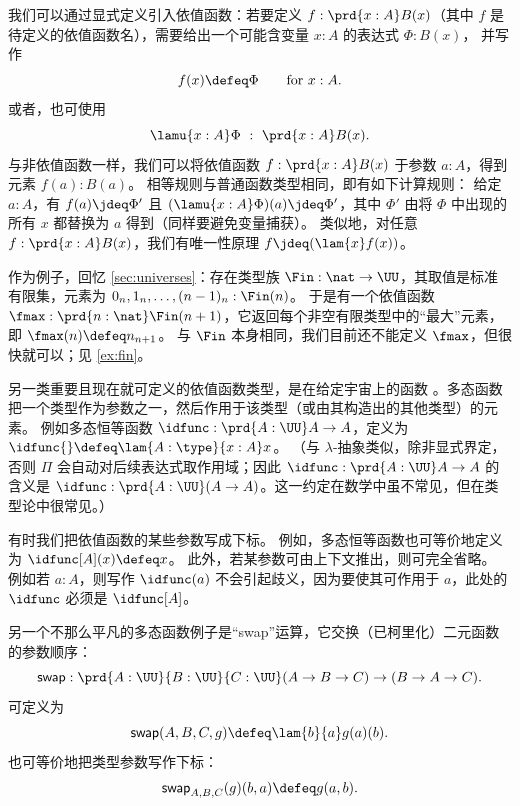 %
我们可以通过显式定义引入依值函数：若要定义 $f : \prd{x:A}B(x)$（其中 $f$ 是待定义的依值函数名），需要给出一个可能含变量 $x:A$ 的表达式 $\Phi : B(x)$，
%
并写作
\[ f(x) \defeq \Phi \qquad \mbox{for $x:A$}.\]
或者，也可使用%
%
\begin{equation}
  \label{eq:lambda-abstraction}
  \lamu{x:A} \Phi \ :\ \prd{x:A} B(x).
\end{equation}
%
%
与非依值函数一样，我们可以将依值函数 $f : \prd{x:A}B(x)$ 于参数 $a:A$，得到元素 $f(a):B(a)$。
相等规则与普通函数类型相同，即有如下计算规则：
%
给定 $a:A$，有 $f(a) \jdeq \Phi'$ 且 $(\lamu{x:A} \Phi)(a) \jdeq \Phi'$，其中 $\Phi'$ 由将 $\Phi$ 中出现的所有 $x$ 都替换为 $a$ 得到（同样要避免变量捕获）。
类似地，对任意 $f:\prd{x:A} B(x)$，我们有唯一性原理 $f\jdeq (\lam{x} f(x))$。
%

作为例子，回忆 \cref{sec:universes}：存在类型族 $\Fin:\nat\to\UU$，其取值是标准有限集，元素为 $0_n,1_n,\dots,(n-1)_n : \Fin(n)$。
于是有一个依值函数 $\fmax : \prd{n:\nat} \Fin(n+1)$，它返回每个非空有限类型中的“最大”元素，即 $\fmax(n) \defeq n_{n+1}$。
%
与 $\Fin$ 本身相同，我们目前还不能定义 $\fmax$，但很快就可以；见 \cref{ex:fin}。

另一类重要且现在就可定义的依值函数类型，是在给定宇宙上的函数
%
%
。多态函数把一个类型作为参数之一，然后作用于该类型（或由其构造出的其他类型）的元素。
%
%
%
例如多态恒等函数 $\idfunc : \prd{A:\UU} A \to A$，定义为 $\idfunc{} \defeq \lam{A:\type}{x:A} x$。
（与 $\lambda$-抽象类似，除非显式界定，否则 $\Pi$ 会自动对后续表达式取作用域；因此 $\idfunc : \prd{A:\UU} A \to A$ 的含义是 $\idfunc : \prd{A:\UU} (A \to A)$。这一约定在数学中虽不常见，但在类型论中很常见。）

有时我们把依值函数的某些参数写成下标。
例如，多态恒等函数也可等价地定义为 $\idfunc[A](x) \defeq x$。
此外，若某参数可由上下文推出，则可完全省略。
例如若 $a:A$，则写作 $\idfunc(a)$ 不会引起歧义，因为要使其可作用于 $a$，此处的 $\idfunc$ 必须是 $\idfunc[A]$。

另一个不那么平凡的多态函数例子是“swap”运算，它交换（已柯里化）二元函数的参数顺序：
\[ \mathsf{swap} : \prd{A:\UU}{B:\UU}{C:\UU} (A\to B\to C) \to (B\to A \to C). \]
可定义为
\[ \mathsf{swap}(A,B,C,g) \defeq \lam{b}{a} g(a)(b). \]
也可等价地把类型参数写作下标：
\[ \mathsf{swap}_{A,B,C}(g)(b,a) \defeq g(a,b). \]

